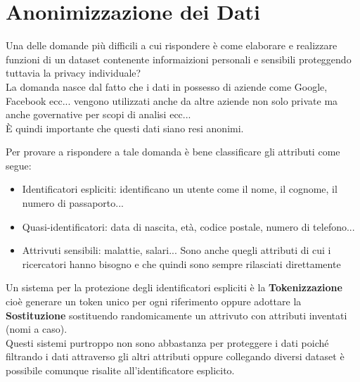 \section{Anonimizzazione dei Dati}
\label{sec:dataanonimyzation}
Una delle domande più difficili a cui rispondere è come elaborare e realizzare funzioni di un dataset contenente informaizioni personali e sensibili proteggendo tuttavia la privacy individuale?\\
La domanda nasce dal fatto che i dati in possesso di aziende come Google, Facebook ecc... vengono utilizzati anche da altre aziende non solo private ma anche governative per scopi di analisi ecc...\\
È quindi importante che questi dati siano resi anonimi.

Per provare a rispondere a tale domanda è bene classificare gli attributi come segue:
\begin{itemize}[noitemsep]
    \item Identificatori espliciti: identificano un utente come il nome, il cognome, il numero di passaporto...
    \item Quasi-identificatori: data di nascita, età, codice postale, numero di telefono...
    \item Attrivuti sensibili: malattie, salari... Sono anche quegli attributi di cui i ricercatori hanno bisogno e che quindi sono sempre rilasciati direttamente
\end{itemize}
Un sistema per la protezione degli identificatori espliciti è la \textbf{Tokenizzazione} cioè generare un token unico per ogni riferimento oppure adottare la \textbf{Sostituzione} sostituendo randomicamente un attrivuto con attributi inventati (nomi a caso).\\
Questi sistemi purtroppo non sono abbastanza per proteggere i dati poiché filtrando i dati attraverso gli altri attributi oppure collegando diversi dataset è possibile comunque risalite all'identificatore esplicito.

